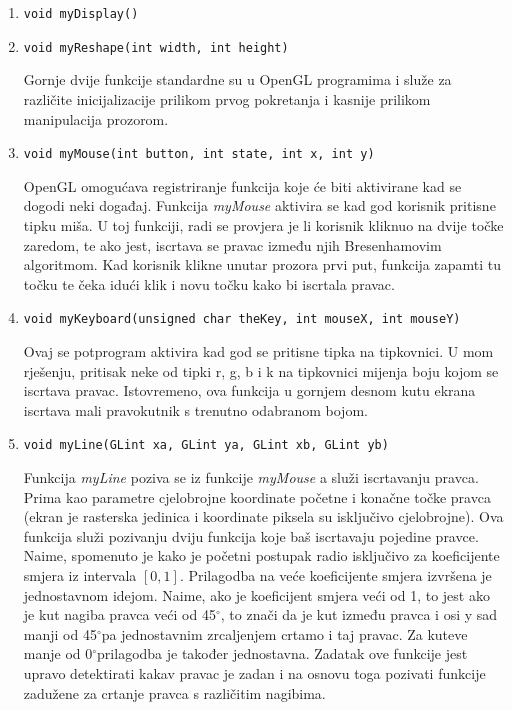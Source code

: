 \documentclass[utf8]{fer}
\newcommand{\degree}{\ensuremath{^\circ}}
\begin{document}
\begin{enumerate}
\item \begin{lstlisting}
void myDisplay()
\end{lstlisting}

\item \begin{lstlisting}
void myReshape(int width, int height)
\end{lstlisting}

Gornje dvije funkcije standardne su u OpenGL programima i služe za različite inicijalizacije prilikom prvog pokretanja i kasnije prilikom manipulacija prozorom.

\item \begin{lstlisting}
void myMouse(int button, int state, int x, int y)
\end{lstlisting}

OpenGL omogućava registriranje funkcija koje će biti aktivirane kad se dogodi neki događaj. Funkcija \textit{myMouse} aktivira se kad god korisnik pritisne tipku miša. U toj funkciji, radi se provjera je li korisnik kliknuo na dvije točke zaredom, te ako jest, iscrtava se pravac između njih Bresenhamovim algoritmom. Kad korisnik klikne unutar prozora prvi put, funkcija zapamti tu točku te čeka idući klik i novu točku kako bi iscrtala pravac.

\item \begin{lstlisting}
void myKeyboard(unsigned char theKey, int mouseX, int mouseY)
\end{lstlisting}
Ovaj se potprogram aktivira kad god se pritisne tipka na tipkovnici. U mom rješenju, pritisak neke od tipki r, g, b i k na tipkovnici mijenja boju kojom se iscrtava pravac. Istovremeno, ova funkcija u gornjem desnom kutu ekrana iscrtava mali pravokutnik s trenutno odabranom bojom. 

\item \begin{lstlisting}
void myLine(GLint xa, GLint ya, GLint xb, GLint yb)
\end{lstlisting}

Funkcija \textit{myLine} poziva se iz funkcije \textit{myMouse} a služi iscrtavanju pravca. Prima kao parametre cjelobrojne koordinate početne i konačne točke pravca (ekran je rasterska jedinica i koordinate piksela su isključivo cjelobrojne). Ova funkcija služi pozivanju dviju funkcija koje baš iscrtavaju pojedine pravce. Naime, spomenuto je kako je početni postupak radio isključivo za koeficijente smjera iz intervala $[0,1]$. Prilagodba na veće koeficijente smjera izvršena je jednostavnom idejom. Naime, ako je koeficijent smjera veći od 1, to jest ako je kut nagiba pravca veći od 45\degree , to znači da je kut između pravca i osi y sad manji od 45\degree pa jednostavnim zrcaljenjem crtamo i taj pravac. Za kuteve manje od 0\degree prilagodba je također jednostavna. Zadatak ove funkcije jest upravo detektirati kakav pravac je zadan i na osnovu toga pozivati funkcije zadužene za crtanje pravca s različitim nagibima.


\end{enumerate}
\end{document}
